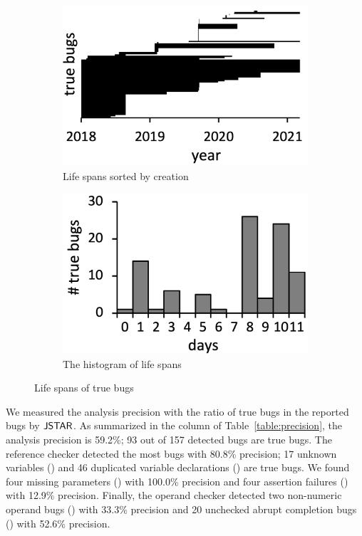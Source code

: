 \begin{figure}
  \centering
  \begin{subfigure}[b]{0.24\textwidth}
    \includegraphics[width=\textwidth]{img/life-sort}
    \caption{Life spans sorted by creation}
  \end{subfigure}
  \begin{subfigure}[b]{0.24\textwidth}
    \includegraphics[width=\textwidth]{img/life-hist}
    \caption{The histogram of life spans}
  \end{subfigure}
  \caption{Life spans of true bugs}
  \vspace*{-1.5em}
  \label{fig:life}
\end{figure}

We measured the analysis precision with the ratio of true bugs in the reported bugs by $\tool$.
As summarized in the  column of Table~\ref{table:precision}, the analysis precision
is 59.2\%; 93 out of 157 detected bugs are true bugs.
The reference checker detected the most bugs with 80.8\% precision;
17 unknown variables () and
46 duplicated variable declarations () are true bugs.
We found four missing parameters () with 100.0\% precision and
four assertion failures () with 12.9\% precision.
Finally, the operand checker detected
two non-numeric operand bugs () with 33.3\% precision and
20 unchecked abrupt completion bugs () with 52.6\% precision.

